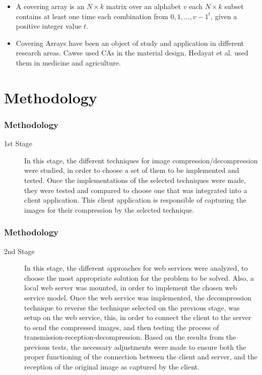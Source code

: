 \documentclass[compress]{beamer}
\begin{document}
\begin{frame}
	\begin{itemize}
	\item A covering array is an $N \times k$ matrix over an alphabet $v$ each $N \times k$ subset contains at least one time each combination from ${0,1,\ldots,v−1}^{t}$, given a positive integer value $t$.
	\end{itemize}
\end{frame}

\begin{frame}
	\begin{itemize}
	\item Covering Arrays have been an object of study and application in different research areas. Cawse \cite{Cawse:2003} used CAs in the material design, Hedayat et al. \cite{Hedayat:1999} used them in medicine and agriculture.
	\end{itemize}
\end{frame}

\section{Methodology}
\begin{frame}
	\frametitle{Methodology}
	\begin{description}
\item[1st Stage] In this stage, the different techniques for image compression/decompression were studied, in order to choose a set of them to be implemented and tested. Once the implementations of the selected techniques were made, they were tested and compared to choose one that was integrated into a client application. This client application is responsible of capturing the images for their compression by the selected technique.
\end{description}
\end{frame}

\begin{frame}
	\frametitle{Methodology}
	\begin{description}
\item[2nd Stage] In this stage, the different approaches for web services were analyzed, to choose the most appropriate solution for the problem to be solved. Also, a local web server was mounted, in order to implement the chosen web service model. Once the web service was implemented, the decompression technique to reverse the technique selected on the previous stage, was setup on the web service, this, in order to connect the client to the server to send the compressed images, and then testing the process of transmission-reception-decompression. Based on the results from the previous tests, the necessary adjustments were made to ensure both the proper functioning of the connection between the client and server, and the reception of the original image as captured by the client.
\end{description}
\end{frame}
\end{document}
